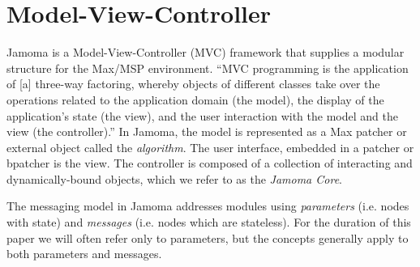 \documentclass{article}
\begin{document}

% 




\section{Model-View-Controller} %

Jamoma is a Model-View-Controller (MVC) framework that supplies a modular structure for the Max/MSP environment. ``MVC programming is the application of [a] three-way factoring, whereby objects of different classes take over the operations related to the application domain (the model), the display of the application's state (the view), and the user interaction with the model and the view (the controller).'' \cite{Krasner:1988}  In Jamoma, the model is represented as a Max patcher or external object called the \emph{algorithm}.  The user interface, embedded in a patcher or bpatcher is the view.  The controller is composed of a collection of interacting and dynamically-bound objects, which we refer to as the \emph{Jamoma Core}.


The messaging model in Jamoma addresses modules using \emph{parameters} (i.e. nodes with state) and \emph{messages} (i.e. nodes which are stateless). For the duration of this paper we will often refer only to parameters, but the concepts generally apply to both parameters and messages.
\end{document}

